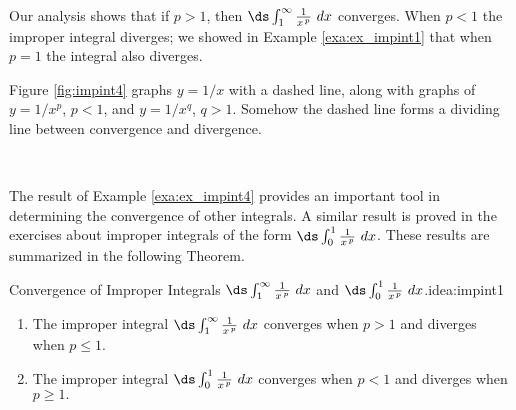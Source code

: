 \begin{solution}
{{
}

Our analysis shows that if $p>1$, then $\ds\int_1^\infty \frac1{x\hskip1pt ^p}\ dx $ converges. When $p<1$ the improper integral diverges; we showed in Example \ref{exa:ex_impint1} that when $p=1$ the integral also diverges. 

Figure \ref{fig:impint4} graphs $y=1/x$ with a dashed line, along with graphs of $y=1/x^p$, $p<1$, and $y=1/x^q$, $q>1$. Somehow the dashed line forms a dividing line between convergence and divergence. %
}\\
\end{solution}





The result of Example \ref{exa:ex_impint4} provides an important tool in determining the convergence of other integrals. A similar result is proved in the exercises about improper integrals of the form $\ds \int_0^1\frac1{x\hskip1pt ^p}\ dx$. These results are summarized in the following Theorem.

\begin{theorem}{Convergence of Improper Integrals $\ds \int_1^\infty\frac1{x\hskip1pt ^p}\ dx$ and $\ds \int_0^1\frac1{x\hskip1pt ^p}\ dx$.}{idea:impint1}
{
\begin{enumerate}
\item		The improper integral $\ds \int_1^\infty\frac1{x\hskip1pt ^p}\ dx$ converges when $p>1$ and diverges when $p\leq 1.$
\item		The improper integral $\ds \int_0^1\frac1{x\hskip1pt ^p}\ dx$ converges when $p<1$ and diverges when $p\geq 1.$
\end{enumerate}
}
\end{theorem}




